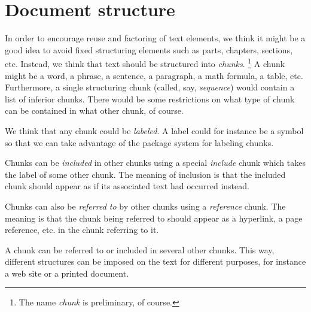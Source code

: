 \chapter{Document structure}
\label{chap-document-structure}

In order to encourage reuse and factoring of text elements, we think
it might be a good idea to avoid fixed structuring elements such as
parts, chapters, sections, etc.  Instead, we think that text should be
structured into \emph{chunks}.%
\footnote{The name \emph{chunk} is preliminary, of course.}
A chunk might be a word, a phrase, a sentence, a paragraph, a math
formula, a table, etc.  Furthermore, a single structuring chunk
(called, say, \emph{sequence}) would contain a list of inferior
chunks.  There would be some restrictions on what type of chunk can be
contained in what other chunk, of course.  

We think that any chunk could be \emph{labeled}.  A label could for
instance be a \cl{} symbol so that we can take advantage of the
package system for labeling chunks.

Chunks can be \emph{included} in other chunks using a special
\emph{include} chunk which takes the label of some other chunk.
The meaning of inclusion is that the included chunk should appear as
if its associated text had occurred instead.  

Chunks can also be \emph{referred to} by other chunks using a
\emph{reference} chunk.  The meaning is that the chunk being referred
to should appear as a hyperlink, a page reference, etc. in the chunk
referring to it. 

A chunk can be referred to or included in several other chunks.  This
way, different structures can be imposed on the text for different
purposes, for instance a web site or a printed document. 
